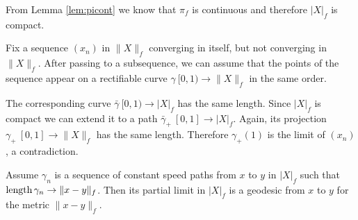\documentclass{article}
\begin{document}
From Lemma \ref{lem:picont} we know that $\pi_f$ is continuous and therefore $|X|_f$ is compact.

Fix a sequence $(x_n)$ in $\|X\|_f$ converging in itself, but not converging in $\|X\|_f$.
After passing to a subsequence, we can assume that the points of the sequence appear on a rectifiable curve $\gamma\:[0,1)\to\|X\|_f$ in the same order.

The corresponding curve $\bar\gamma\:[0,1)\to |X|_f$ has the same length.
Since $|X|_f$ is compact we can extend it to a path $\bar\gamma_+\:[0,1]\to |X|_f$.
Again, its projection $\gamma_+\:[0,1]\to\|X\|_f$ has the same length.
Therefore $\gamma_+(1)$ is the limit of $(x_n)$, a contradiction.

Assume $\gamma_n$ is a sequence of constant speed paths from $x$ to $y$ in $|X|_f$
such that $\mathop{\rm length}\nolimits\gamma_n\to \|x-y\|_f$.
Then its partial limit in $|X|_f$ is a geodesic from $x$ to $y$ for the metric $\|x-y\|_f$.
\qeds



\end{document}
